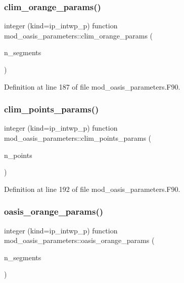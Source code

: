 \subsubsection{\texorpdfstring{clim\+\_\+orange\+\_\+params()}{clim\_orange\_params()}}
{\footnotesize\ttfamily integer (kind=ip\+\_\+intwp\+\_\+p) function mod\+\_\+oasis\+\_\+parameters\+::clim\+\_\+orange\+\_\+params (\begin{DoxyParamCaption}\item[{integer (kind=ip\+\_\+intwp\+\_\+p), intent(in)}]{n\+\_\+segments }\end{DoxyParamCaption})}



Definition at line 187 of file mod\+\_\+oasis\+\_\+parameters.\+F90.

\mbox{\label{namespacemod__oasis__parameters_a1f4f746e95fc0b05147aaa0b82a77a54}} 
\subsubsection{\texorpdfstring{clim\+\_\+points\+\_\+params()}{clim\_points\_params()}}
{\footnotesize\ttfamily integer (kind=ip\+\_\+intwp\+\_\+p) function mod\+\_\+oasis\+\_\+parameters\+::clim\+\_\+points\+\_\+params (\begin{DoxyParamCaption}\item[{integer (kind=ip\+\_\+intwp\+\_\+p), intent(in)}]{n\+\_\+points }\end{DoxyParamCaption})}



Definition at line 192 of file mod\+\_\+oasis\+\_\+parameters.\+F90.

\mbox{\label{namespacemod__oasis__parameters_a3f85c99a22ed2a7ac207c8f21c1a363c}} 
\subsubsection{\texorpdfstring{oasis\+\_\+orange\+\_\+params()}{oasis\_orange\_params()}}
{\footnotesize\ttfamily integer (kind=ip\+\_\+intwp\+\_\+p) function mod\+\_\+oasis\+\_\+parameters\+::oasis\+\_\+orange\+\_\+params (\begin{DoxyParamCaption}\item[{integer (kind=ip\+\_\+intwp\+\_\+p), intent(in)}]{n\+\_\+segments }\end{DoxyParamCaption})}



